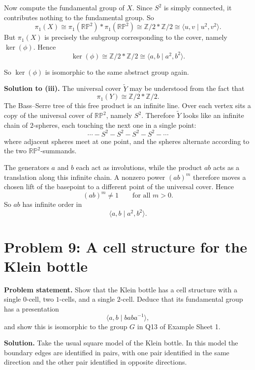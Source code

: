 \documentclass[12pt,a4paper]{article}
\theoremstyle{notespace}
\begin{document}
Now compute the fundamental group of \(X\). Since \(S^2\) is simply connected, it contributes nothing to the fundamental group. So
\[
\pi_1(X)\cong \pi_1(\mathbb{RP}^2)*\pi_1(\mathbb{RP}^2)
\cong \mathbb Z/2 * \mathbb Z/2
\cong \langle u,v \mid u^2,v^2\rangle.
\]
But \(\pi_1(X)\) is precisely the subgroup corresponding to the cover, namely \(\ker(\phi)\). Hence
\[
\ker(\phi)\cong \mathbb Z/2 * \mathbb Z/2
\cong \langle a,b \mid a^2,b^2\rangle.
\]

So \(\ker(\phi)\) is isomorphic to the same abstract group again.

\medskip

\textbf{Solution to (iii).}
The universal cover \(\widetilde{Y}\) may be understood from the fact that
\[
\pi_1(Y)\cong \mathbb Z/2 * \mathbb Z/2.
\]
The Bass--Serre tree of this free product is an infinite line. Over each vertex sits a copy of the universal cover of \(\mathbb{RP}^2\), namely \(S^2\). Therefore \(\widetilde{Y}\) looks like an infinite chain of \(2\)-spheres, each touching the next one in a single point:
\[
\cdots - S^2 - S^2 - S^2 - S^2 - \cdots
\]
where adjacent spheres meet at one point, and the spheres alternate according to the two \(\mathbb{RP}^2\)-summands.

The generators \(a\) and \(b\) each act as involutions, while the product \(ab\) acts as a translation along this infinite chain. A nonzero power \((ab)^m\) therefore moves a chosen lift of the basepoint to a different point of the universal cover. Hence
\[
(ab)^m\neq 1 \qquad \text{for all } m>0.
\]
So \(ab\) has infinite order in
\[
\langle a,b \mid a^2,b^2\rangle.
\]

\bigskip

\section{Problem 9: A cell structure for the Klein bottle}

\textbf{Problem statement.}
Show that the Klein bottle has a cell structure with a single \(0\)-cell, two \(1\)-cells, and a single \(2\)-cell. Deduce that its fundamental group has a presentation
\[
\langle a,b \mid baba^{-1}\rangle,
\]
and show this is isomorphic to the group \(G\) in Q13 of Example Sheet 1.

\medskip

\textbf{Solution.}
Take the usual square model of the Klein bottle. In this model the boundary edges are identified in pairs, with one pair identified in the same direction and the other pair identified in opposite directions.
\end{document}
